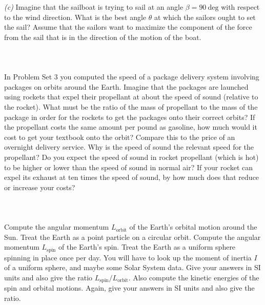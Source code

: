 \documentclass[12pt]{article}
\newcounter{problem}
\begin{document}
\textsl{(c)} Imagine that the sailboat is trying to sail at an angle
$\beta=90~\mathrm{deg}$ with respect to the wind direction.  What is
the best angle $\theta$ at which the sailors ought to set the sail?
Assume that the sailors want to maximize the component of the force
from the sail that is in the direction of the motion of the boat.

\paragraph{\problemname~\theproblem}

In Problem Set 3 you computed the speed of a package delivery system
involving packages on orbits around the Earth.  Imagine that the
packages are launched using rockets that expel their propellant at
about the speed of sound (relative to the rocket).  What must be the
ratio of the mass of propellant to the mass of the package in order
for the rockets to get the packages onto their correct orbits?  If the
propellant costs the same amount per pound as gasoline, how much would
it cost to get your textbook onto the orbit?  Compare this to the
price of an overnight delivery service.  Why is the speed of sound the
relevant speed for the propellant?  Do you expect the speed of sound
in rocket propellant (which is hot) to be higher or lower than the
speed of sound in normal air?  If your rocket can expel its exhaust at
ten times the speed of sound, by how much does that reduce or increase
your costs?

\paragraph{\problemname~\theproblem}

Compute the angular momentum $L_\mathrm{orbit}$ of the Earth's orbital
motion around the Sun.  Treat the Earth as a point particle on a
circular orbit.  Compute the angular momentum $L_\mathrm{spin}$ of the
Earth's spin.  Treat the Earth as a uniform sphere spinning in place
once per day.  You will have to look up the moment of inertia $I$ of a
uniform sphere, and maybe some Solar System data.  Give your answers
in SI units and also give the ratio
$L_\mathrm{spin}/L_\mathrm{orbit}$.  Also compute the kinetic energies
of the spin and orbital motions.  Again, give your answers in SI units
and also give the ratio.

\paragraph{\problemname~\theproblem}
\end{document}
